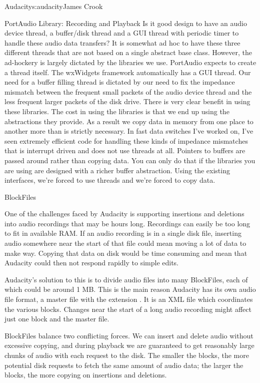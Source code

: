 \begin{aosachapter}{Audacity}{s:audacity}{James Crook}
\begin{aosasect1}{PortAudio Library: Recording and Playback}
Is it good design to have an audio device thread, a buffer/disk thread
and a GUI thread with periodic timer to handle these audio data
transfers?  It is somewhat ad hoc to have these three different
threads that are not based on a single abstract base class.  However,
the ad-hockery is largely dictated by the libraries we use.  PortAudio
expects to create a thread itself.  The wxWidgets framework
automatically has a GUI thread.  Our need for a buffer filling thread
is dictated by our need to fix the impedance mismatch between the
frequent small packets of the audio device thread and the less
frequent larger packets of the disk drive.  There is very clear
benefit in using these libraries.  The cost in using the libraries is
that we end up using the abstractions they provide.  As a result we
copy data in memory from one place to another more than is strictly
necessary.  In fast data switches I've worked on, I've seen extremely
efficient code for handling these kinds of impedance mismatches
that is interrupt driven and does not use threads at all.  Pointers to
buffers are passed around rather than copying data.  You can only do
that if the libraries you are using are designed with a richer buffer
abstraction.  Using the existing interfaces, we're forced to use
threads and we're forced to copy data.

\end{aosasect1}

\begin{aosasect1}{BlockFiles}

One of the challenges faced by Audacity is supporting insertions and
deletions into audio recordings that may be hours long.  Recordings
can easily be too long to fit in available RAM\@.  If an audio recording
is in a single disk file, inserting audio somewhere near the start of
that file could mean moving a lot of data to make way.  Copying that
data on disk would be time consuming and mean that Audacity could then
not respond rapidly to simple edits.

Audacity's solution to this is to divide audio files into many
BlockFiles, each of which could be around 1 MB\@.  This is the main
reason Audacity has its own audio file format, a master file with the
extension .  It is an XML file which coordinates the various
blocks.  Changes near the start of a long audio recording might affect
just one block and the master  file.

BlockFiles balance two conflicting forces.  We can insert and delete
audio without excessive copying, and during playback we are guaranteed
to get reasonably large chunks of audio with each request to the disk.
The smaller the blocks, the more potential disk requests to fetch the
same amount of audio data; the larger the blocks, the more copying on
insertions and deletions.


\end{aosasect1}
\end{aosachapter}
